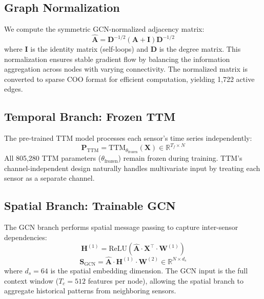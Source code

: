 \documentclass[11pt, a4paper]{article}
\begin{document}
\subsection{Graph Normalization}

We compute the symmetric GCN-normalized adjacency matrix:
\begin{equation}
    \hat{\mathbf{A}} = \mathbf{D}^{-1/2} (\mathbf{A} + \mathbf{I}) \mathbf{D}^{-1/2}
\end{equation}
where $\mathbf{I}$ is the identity matrix (self-loops) and $\mathbf{D}$ is the degree matrix. This normalization ensures stable gradient flow by balancing the information aggregation across nodes with varying connectivity. The normalized matrix is converted to sparse COO format for efficient computation, yielding 1,722 active edges.

\subsection{Temporal Branch: Frozen TTM}

The pre-trained TTM model processes each sensor's time series independently:
\begin{equation}
    \mathbf{P}_{\text{TTM}} = \text{TTM}_{\theta_{\text{frozen}}}(\mathbf{X}) \in \mathbb{R}^{T_f \times N}
\end{equation}
All 805,280 TTM parameters ($\theta_{\text{frozen}}$) remain frozen during training. TTM's channel-independent design naturally handles multivariate input by treating each sensor as a separate channel.

\subsection{Spatial Branch: Trainable GCN}

The GCN branch performs spatial message passing to capture inter-sensor dependencies:
\begin{equation}
    \mathbf{H}^{(1)} = \text{ReLU}\left(\hat{\mathbf{A}} \cdot \mathbf{X}^{\top} \cdot \mathbf{W}^{(1)}\right)
\end{equation}
\begin{equation}
    \mathbf{S}_{\text{GCN}} = \hat{\mathbf{A}} \cdot \mathbf{H}^{(1)} \cdot \mathbf{W}^{(2)} \in \mathbb{R}^{N \times d_s}
\end{equation}
where $d_s = 64$ is the spatial embedding dimension. The GCN input is the full context window ($T_c = 512$ features per node), allowing the spatial branch to aggregate historical patterns from neighboring sensors.
\end{document}
